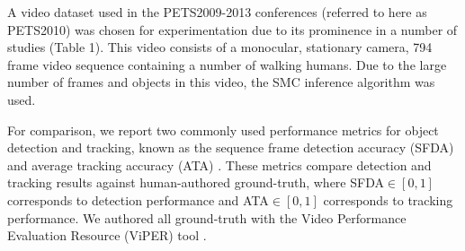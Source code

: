 \documentclass{article}
\begin{document}
A video dataset used in the PETS2009-2013 conferences (referred to here as PETS2010) was chosen for experimentation due to its prominence in a number of studies (Table 1).
This video consists of a monocular, stationary camera, 794 frame video sequence containing a number of walking humans. Due to the large number of frames and objects in this video, the SMC inference algorithm was used.

For comparison,  we report two commonly used performance metrics for object detection and tracking, known as the sequence frame detection accuracy (SFDA) and average tracking accuracy (ATA) \cite{kasturi_2008}. These metrics compare detection and tracking results against human-authored ground-truth, where SFDA$\in [0,1]$ corresponds to detection performance and ATA$\in[0,1]$ corresponds to tracking performance. We authored all ground-truth with the Video Performance Evaluation Resource (ViPER) tool \cite{doermann_2000}.

\end{document}
